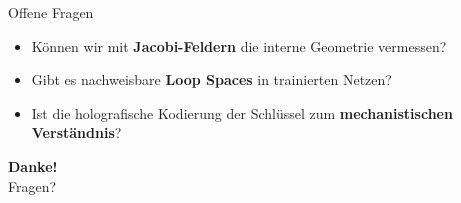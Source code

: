 \documentclass[aspectratio=169, 12pt]{beamer}
\newcommand{\stich}[1]{\item[\color{akzent}\faAngleRight] #1}
\begin{document}
\begin{frame}{Offene Fragen}
  \begin{itemize}
    \stich{Können wir mit \textbf{Jacobi-Feldern} die interne Geometrie vermessen?}
    \stich{Gibt es nachweisbare \textbf{Loop Spaces} in trainierten Netzen?}
    \stich{Ist die holografische Kodierung der Schlüssel zum
           \textbf{mechanistischen Verständnis}?}
  \end{itemize}

  \vfill
  \begin{center}
    {\Large\color{akzent}\textbf{Danke!}}\\[0.5em]
    {\small Fragen?}
  \end{center}
\end{frame}

\end{document}

